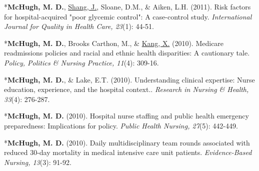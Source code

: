 \documentclass[10pt,]{article}
\begin{document}
{{{{{{{{{{{{{{\begin{hangparas}{.25in}{1}
\end{hangparas}

\vspace{4mm}

\begin{hangparas}{.25in}{1}

*{\textbf {McHugh, M. D.}}, {\underline {Shang, J.}}, Sloane, D.M., \& Aiken, L.H. (2011). Risk factors for hospital-acquired "poor glycemic control": A case-control study. {\textit {International Journal for Quality in Health Care, 23}}(1): 44-51.

\end{hangparas}

\vspace{4mm}

\begin{hangparas}{.25in}{1}

*{\textbf {McHugh, M. D.}}, Brooks Carthon, M., \& {\underline {Kang, X.}} (2010). Medicare readmissions policies and racial and ethnic health disparities: A cautionary tale. {\textit {Policy, Politics \& Nursing Practice, 11}}(4): 309-16.

\end{hangparas}

\vspace{4mm}

\begin{hangparas}{.25in}{1}

*{\textbf {McHugh, M. D.}}, \& Lake, E.T. (2010). Understanding clinical expertise: Nurse education, experience, and the hospital context.. {\textit {Research in Nursing \& Health, 33}}(4): 276-287.

\end{hangparas}

\vspace{4mm}

\begin{hangparas}{.25in}{1}

*{\textbf {McHugh, M. D.}} (2010). Hospital nurse staffing and public health emergency preparedness: Implications for policy. {\textit {Public Health Nursing, 27}}(5): 442-449.

\end{hangparas}

\vspace{4mm}

\begin{hangparas}{.25in}{1}

*{\textbf {McHugh, M. D.}} (2010). Daily multidisciplinary team rounds associated with reduced 30-day mortality in medical intensive care unit patients. {\textit {Evidence-Based Nursing, 13}}(3): 91-92.


\end{hangparas}}}}}}}}}}}}}}}
\end{document}
